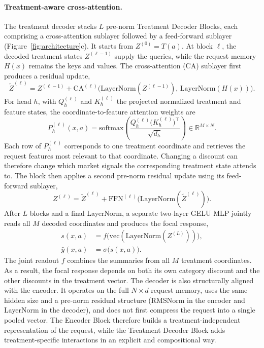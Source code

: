 \documentclass[sigconf,nonacm]{acmart}
\begin{document}
\paragraph{Treatment-aware cross-attention.}
The treatment decoder stacks $L$ pre-norm Treatment Decoder Blocks, each comprising a cross-attention sublayer followed by a feed-forward sublayer (Figure~\ref{fig:architecture}c). It starts from $Z^{(0)}=T(a)$. At block $\ell$, the decoded treatment states $Z^{(\ell-1)}$ supply the queries, while the request memory $H(x)$ remains the keys and values. The cross-attention (CA) sublayer first produces a residual update,
\begin{equation}
    \label{eq:cross-attn-update}
    \widetilde Z^{(\ell)}
    = Z^{(\ell-1)} + \mathrm{CA}^{(\ell)}\!\bigl(\mathrm{LayerNorm}(Z^{(\ell-1)}),\, \mathrm{LayerNorm}(H(x))\bigr).
\end{equation}
For head $h$, with $Q_h^{(\ell)}$ and $K_h^{(\ell)}$ the projected normalized treatment and feature states, the coordinate-to-feature attention weights are
\begin{equation}
    P_h^{(\ell)}(x,a)=
    \mathrm{softmax}\!\left(
    \frac{Q_h^{(\ell)}\bigl(K_h^{(\ell)}\bigr)^\top}{\sqrt{d_h}}
    \right)\in\mathbb R^{M\times N}.
\end{equation}
Each row of $P_h^{(\ell)}$ corresponds to one treatment coordinate and retrieves the request features most relevant to that coordinate. Changing a discount can therefore change which market signals the corresponding treatment state attends to. The block then applies a second pre-norm residual update using its feed-forward sublayer,
\begin{equation}
    \label{eq:decoder-ffn-update}
    Z^{(\ell)}
    = \widetilde Z^{(\ell)} + \mathrm{FFN}^{(\ell)}\!\bigl(\mathrm{LayerNorm}(\widetilde Z^{(\ell)})\bigr).
\end{equation}
After $L$ blocks and a final LayerNorm, a separate two-layer GELU MLP jointly reads all $M$ decoded coordinates and produces the focal response,
\begin{equation}
\label{eq:readout}
    \begin{aligned}
    s(x,a) &= f\!\bigl(\mathrm{vec}(\mathrm{LayerNorm}(Z^{(L)}))\bigr), \\
    \hat y(x,a) &= \sigma\bigl(s(x,a)\bigr).
    \end{aligned}
\end{equation}
The joint readout $f$ combines the summaries from all $M$ treatment
coordinates. As a result, the focal response depends on both its own category
discount and the other discounts in the treatment vector. The decoder is also structurally aligned with the encoder. It operates on the full $N\times d$ request memory, uses the same hidden size and a pre-norm
residual structure (RMSNorm in the encoder and LayerNorm in the decoder), and does not first compress the request into a single
pooled vector. The Encoder Block therefore builds a treatment-independent representation of the request, while the Treatment Decoder Block adds treatment-specific interactions in an explicit and compositional way.
\end{document}
